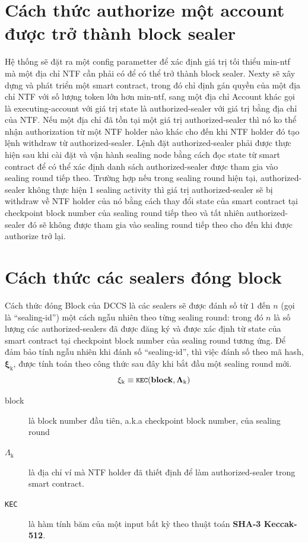 \documentclass[12pt]{amsart}
\begin{document}
\begin{multicols}{2}
\section{Cách thức authorize một account được trở thành block sealer}
Hệ thống sẽ đặt ra một config parametter để xác định giá trị tối thiểu min-ntf mà một địa chỉ NTF cần phải có để có thể trở thành block sealer.
Nexty sẽ xây dựng và phát triển một smart contract, trong đó chỉ định gán quyền của một địa chỉ NTF với số lượng token lớn hơn min-ntf, sang một địa chỉ Account khác gọi là executing-account với giá trị state là authorized-sealer với giá trị bằng địa chỉ của NTF. Nếu một địa chỉ đã tồn tại một giá trị authorized-sealer thì nó ko thể nhận authorization từ một NTF holder nào khác cho đến khi NTF holder đó tạo lệnh withdraw từ authorized-sealer. Lệnh đặt authorized-sealer phải được thực hiện sau khi cài đặt và vận hành sealing node bằng cách đọc state từ smart contract để có thể xác định danh sách authorized-sealer được tham gia vào sealing round tiếp theo. Trường hợp nếu trong sealing round hiện tại, authorized-sealer không thực hiện 1 sealing activity thì giá trị authorized-sealer sẽ bị withdraw về NTF holder của nó bằng cách thay đổi state của smart contract tại checkpoint block number của sealing round tiếp theo và tất nhiên authorized-sealer đó sẽ không được tham gia vào sealing round tiếp theo cho đến khi được authorize trở lại.

\section{Cách thức các sealers đóng block}
Cách thức đóng Block của DCCS là các sealers sẽ được đánh số từ $1$ đến $n$ (gọi là ``sealing-id'') một cách ngẫu nhiên theo từng sealing round: trong đó $n$ là số lượng các authorized-sealers đã được đăng ký và được xác định từ state của smart contract tại checkpoint block number của sealing round tương ứng. Để đảm bảo tính ngẫu nhiên khi đánh số ``sealing-id'', thì việc đánh số theo mã hash, $\boldsymbol{\xi_{\mathrm{k}}}$, được tính toán theo công thức sau đây khi bắt đầu một sealing round mới. 
\begin{equation}
\xi_{\mathrm{k}} \equiv \texttt{\small KEC}(\mathbf{block}, \mathbf{\Lambda_{\mathrm{k}}})
\end{equation}

\begin{description}
\item[block] là block number đầu tiên, a.k.a checkpoint block number, của sealing round
\item[$\Lambda_{\mathrm{k}}$] là địa chỉ ví mà NTF holder đã thiết định để làm authorized-sealer trong smart contract.
\item[\texttt{\small KEC}] là hàm tính băm của một input bất kỳ theo thuật toán \textbf{SHA-3 Keccak-512}.
\end{description}


\end{multicols}
\end{document}
